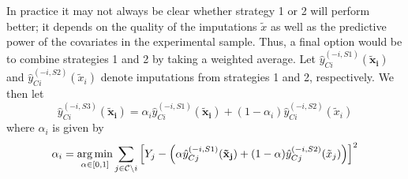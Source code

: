 In practice it may not always be clear whether strategy 1 or 2 will perform better; it depends on the quality of the imputations $\tilde{x}$ as well as the predictive power of the covariates in the experimental sample.  Thus, a final option would be to combine strategies 1 and 2 by taking a weighted average.  Let $\hat{y}^{(-i, S1)}_{Ci}(\mathbf{\tilde{x}_i})$ and $\hat{y}^{(-i, S2)}_{Ci}(\tilde{x}_i)$ denote imputations from strategies 1 and 2, respectively.  We then let
\begin{equation}
\hat{y}^{(-i, S3)}_{Ci}(\mathbf{\tilde{x}_i}) = \alpha_i \hat{y}^{(-i, S1)}_{Ci}(\mathbf{\tilde{x}_i}) + (1-\alpha_i) \hat{y}^{(-i, S2)}_{Ci}(\tilde{x}_i)
\end{equation}
where $\alpha_i$ is given by
\begin{equation}
\alpha_i = \operatorname*{arg\,min}_{\alpha \in [0,1]} \sum_{j \in \mathcal{C} \setminus i} \left[Y_j - \left(\alpha \hat{y}^{(-i, S1)}_{Cj}(\mathbf{\tilde{x}_j}) + (1-\alpha) \hat{y}^{(-i, S2)}_{Cj}(\tilde{x}_j) \right)\right]^2
\end{equation}






